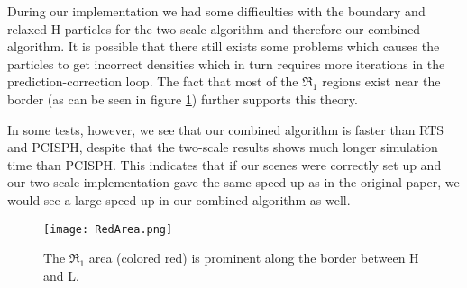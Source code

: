 \documentclass[../../main.tex]{subfiles}
\begin{document}
During our implementation we had some difficulties with the boundary and relaxed H-particles for the two-scale algorithm and therefore our combined algorithm. It is possible that there still exists some problems which causes the particles to get incorrect densities which in turn requires more iterations in the prediction-correction loop. The fact that most of the $\Re_1$ regions exist near the border (as can be seen in figure \ref{fig:redarea}) further supports this theory. 

In some tests, however, we see that our combined algorithm is faster than RTS and PCISPH, despite that the two-scale results shows much longer simulation time than PCISPH. This indicates that if our scenes were correctly set up and our two-scale implementation gave the same speed up as in the original paper, we would see a large speed up in our combined algorithm as well. 


\begin{figure}[h]
    \centering
    \texttt{[image: RedArea.png]}
    \caption[Lower time step along the border]{The $\Re_1$ area (colored red) is prominent along the border between H and L. }
    \label{fig:redarea}
\end{figure}
\end{document}
